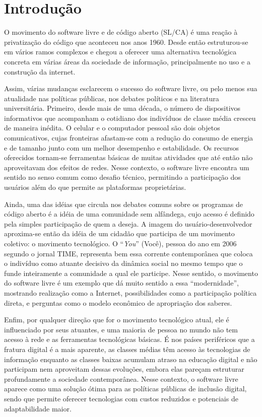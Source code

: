 \chapter*{Introduç\~ao}
	

O movimento do software livre e de código aberto (SL/CA) é uma reação à privatização do código que aconteceu nos anos 1960. Desde então estruturou-se em vários ramos complexos e chegou a oferecer uma alternativa tecnológica concreta em várias áreas da sociedade de informação, principalmente no uso e a construção da internet.

Assim, várias mudanças esclarecem o sucesso do software livre, ou pelo menos sua atualidade nas políticas públicas, nos debates políticos e na literatura universitária. Primeiro, desde mais de uma década, o número de dispositivos informativos que acompanham o cotidiano dos indivíduos de classe média cresceu de maneira inédita. O celular e o computador pessoal são dois objetos comunicativos, cujas fronteiras afastam-se com a redução do consumo de energia e de tamanho junto com um melhor desempenho e estabilidade. Os recursos oferecidos tornam-se ferramentas básicas de muitas atividades que até então não aproveitavam dos efeitos de redes. Nesse contexto, o software livre encontra um sentido no senso comum como desafio técnico, permitindo a participação dos usuários além do que permite as plataformas proprietárias.

Ainda, uma das idéias que circula nos debates comuns sobre os programas de código aberto é a idéia de uma comunidade sem alfândega, cujo acesso é definido pela simples participação de quem a deseja. A imagem do usuário-desenvolvedor aproxima-se então da idéia de um cidadão que participa de um movimento coletivo: o movimento tecnológico. O “\emph{You}” (Você), pessoa do ano em 2006 segundo o jornal TIME, representa bem essa corrente contemporânea que coloca o indivíduo como atuante decisivo da dinâmica social no mesmo tempo que o funde inteiramente a comunidade a qual ele participe. Nesse sentido, o movimento do software livre é um exemplo que dá muito sentido a essa “modernidade”, mostrando realização como a Internet, possibilidades como a participação política direta, e perguntas como o modelo econômico de apropriação dos saberes.

Enfim, por qualquer direção que for o movimento tecnológico atual, ele é influenciado por seus atuantes, e uma maioria de pessoa no mundo não tem acesso à rede e as ferramentas tecnológicas básicas. É nos países periféricos que a fratura digital é a mais aparente, as classes médias têm acesso às tecnologias de informação enquanto as classes baixas acumulam atraso na educação digital e não participam nem aproveitam dessas evoluções, embora elas pareçam estruturar profundamente a sociedade contemporânea. Nesse contexto, o software livre aparece como uma solução ótima para as políticas públicas de inclusão digital, sendo que permite oferecer tecnologias com custos reduzidos e potenciais de adaptabilidade maior.

